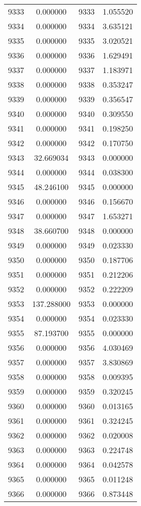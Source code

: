 \documentclass[12pt]{article}
\begin{document}
\begin{longtable}{@{}cccc@{}}
9333 & 0.000000 & 9333 & 1.055520 \\
9334 & 0.000000 & 9334 & 3.635121 \\
9335 & 0.000000 & 9335 & 3.020521 \\
9336 & 0.000000 & 9336 & 1.629491 \\
9337 & 0.000000 & 9337 & 1.183971 \\
9338 & 0.000000 & 9338 & 0.353247 \\
9339 & 0.000000 & 9339 & 0.356547 \\
9340 & 0.000000 & 9340 & 0.309550 \\
9341 & 0.000000 & 9341 & 0.198250 \\
9342 & 0.000000 & 9342 & 0.170750 \\
9343 & 32.669034 & 9343 & 0.000000 \\
9344 & 0.000000 & 9344 & 0.038300 \\
9345 & 48.246100 & 9345 & 0.000000 \\
9346 & 0.000000 & 9346 & 0.156670 \\
9347 & 0.000000 & 9347 & 1.653271 \\
9348 & 38.660700 & 9348 & 0.000000 \\
9349 & 0.000000 & 9349 & 0.023330 \\
9350 & 0.000000 & 9350 & 0.187706 \\
9351 & 0.000000 & 9351 & 0.212206 \\
9352 & 0.000000 & 9352 & 0.222209 \\
9353 & 137.288000 & 9353 & 0.000000 \\
9354 & 0.000000 & 9354 & 0.023330 \\
9355 & 87.193700 & 9355 & 0.000000 \\
9356 & 0.000000 & 9356 & 4.030469 \\
9357 & 0.000000 & 9357 & 3.830869 \\
9358 & 0.000000 & 9358 & 0.009395 \\
9359 & 0.000000 & 9359 & 0.320245 \\
9360 & 0.000000 & 9360 & 0.013165 \\
9361 & 0.000000 & 9361 & 0.324245 \\
9362 & 0.000000 & 9362 & 0.020008 \\
9363 & 0.000000 & 9363 & 0.224748 \\
9364 & 0.000000 & 9364 & 0.042578 \\
9365 & 0.000000 & 9365 & 0.011248 \\
9366 & 0.000000 & 9366 & 0.873448 \\

\end{longtable}
\end{document}
